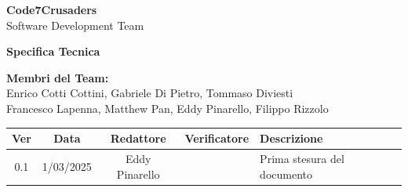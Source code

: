 \documentclass{article}
\begin{document}
\begin{titlepage}
    {\Huge \textbf{Code7Crusaders}}\\
    \vspace{0.5cm}
    {\Large Software Development Team}\\
    \vspace{2cm}
    
    \large \textbf{Specifica Tecnica}
    \vspace{3.9cm}

    \textbf{Membri del Team:}\\
    Enrico Cotti Cottini, Gabriele Di Pietro, Tommaso Diviesti \\
    Francesco Lapenna, Matthew Pan, Eddy Pinarello, Filippo Rizzolo \\
    \vspace{0.5cm}
    
    \vspace{1cm}
\end{titlepage}



\newpage
\begin{table}[h]
    \centering
    \renewcommand{\arraystretch}{1.2}
    \setlength{\tabcolsep}{5pt}
    \begin{tabular}{|c|c|c|c|m{}|}
        \hline
        \textbf{Ver} & \textbf{Data} & \textbf{Redattore} & \textbf{Verificatore} & \textbf{Descrizione} \\
        \hline
        0.1 & 1/03/2025 & Eddy Pinarello &  & Prima stesura del documento \\
        \hline
    \end{tabular}
\end{table}


\newpage
\tableofcontents
\listoftables
\listoffigures

\newpage



\newpage



\newpage



\newpage


\end{document}
